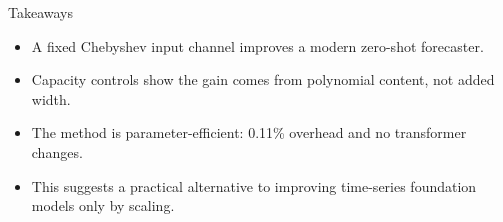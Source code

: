 \documentclass[aspectratio=169]{beamer}
\begin{document}
\begin{frame}{Takeaways}
\large
\begin{itemize}
  \item A fixed Chebyshev input channel improves a modern zero-shot forecaster.
  \item Capacity controls show the gain comes from polynomial content, not added width.
  \item The method is parameter-efficient: 0.11\% overhead and no transformer changes.
  \item This suggests a practical alternative to improving time-series foundation models only by scaling.
\end{itemize}
\end{frame}
\end{document}
